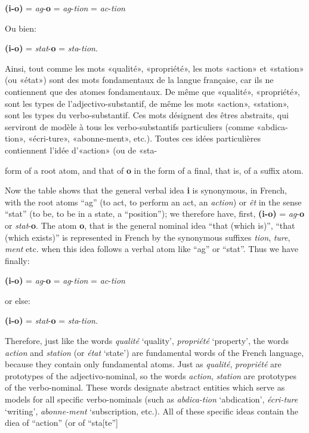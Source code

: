 \begin{sloppypar}
{    \begin{center}
      \textbf{(i-o)} = \emph{ag}-\textbf{o} = \emph{ag}-\emph{tion} =
      \emph{ac}-\emph{tion}
    \end{center}

    Ou bien:

    \begin{center}
      \textbf{(i-o)} = \emph{stat}-\textbf{o} =
      \emph{sta}-\emph{tion}.
    \end{center}

    Ainsi, tout comme les mots «qualité», «propriété», les mots
    «action» et «station» (ou «état») sont des mots fondamentaux de la
    langue française, car ils ne contiennent que des atomes
    fondamentaux. De même que «qualité», «propriété», sont les types
    de l’adjectivo-substantif, de même les mots «action», «station»,
    sont les types du verbo-substantif. Ces mots désignent des êtres
    abstraits, qui serviront de modèle à tous les verbo-substantifs
    particuliers (comme «abdica-tion», «écri-ture», «abonne-ment»,
    etc.). Toutes ces idées particulières contiennent l'idée
    d’«action» (ou de «sta- }%
  {\noindent form of a root atom, and that of \textbf{o} in the form
    of a final, that is, of a suffix atom.

    Now the table shows that the general verbal idea \textbf{i} is
    synonymous, in French, with the root atoms ``ag'' (to act, to
    perform an act, an \emph{action}) or \emph{êt} in the sense ``stat''
    (to be, to be in a state, a ``position''); we therefore have,
    first, \textbf{(i-o)} = \emph{ag}-\textbf{o} or
    \emph{stat}-\textbf{o}. The atom \textbf{o}, that is the general
    nominal idea ``that (which is)'', ``that (which exists)'' is
    represented in French by the synonymous suffixes \emph{tion},
    \emph{ture}, \emph{ment} etc. when this idea follows a verbal atom like
    ``ag'' or ``stat''. Thus we have finally:

     \begin{center}
       \textbf{(i-o)} = \emph{ag}-\textbf{o} = \emph{ag}-\emph{tion} =
       \emph{ac}-\emph{tion}
     \end{center}

     or else:

    \begin{center}
      \textbf{(i-o)} = \emph{stat}-\textbf{o} =
      \emph{sta}-\emph{tion}.
    \end{center}

    Therefore, just like the words \emph{qualité} `quality',
    \emph{propriété} `property', the words \emph{action} and
    \emph{station} (or \emph{état} `state') are fundamental words of
    the French language, because they contain only fundamental
    atoms. Just as \emph{qualité}, \emph{propriété} are prototypes of
    the adjectivo-nominal, so the words \emph{action}, \emph{station}
    are prototypes of the verbo-nominal.  These words designate
    abstract entities which serve as models for all specific
    verbo-nominals (such as \emph{abdica-tion} `abdication',
    \emph{écri-ture} `writing', \emph{abonne-ment} `subscription,
    etc.). All of these specific ideas contain the diea of ``action''
    (or of ``sta[te''] }


\end{sloppypar}
